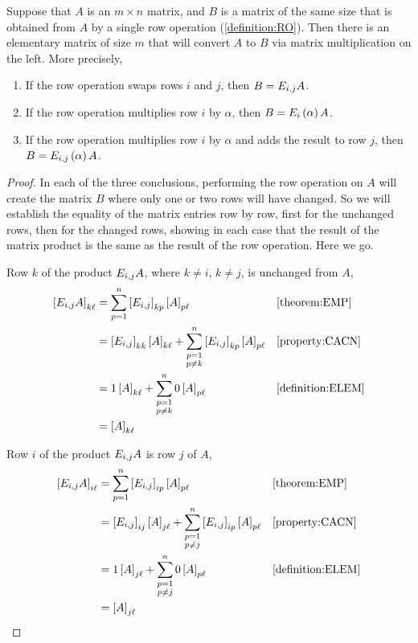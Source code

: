 \documentclass{ximera}
\begin{document}
\begin{theorem}
\label{theorem:EMDRO}

Suppose that $A$ is an $m\times n$ matrix, and $B$ is a matrix of the
same size that is obtained from $A$ by a single row operation
(\ref{definition:RO}).  Then there is an elementary matrix of size $m$
that will convert $A$ to $B$ via matrix multiplication on the left.
More precisely,
\begin{enumerate}
\item If the row operation swaps rows $i$ and $j$, then
  $B=E_{i,j}A$.
\item If the row operation multiplies row $i$ by $\alpha$, then
  $B=E_{i}\left(\alpha\right)A$.
\item If the row operation multiplies row $i$ by $\alpha$ and adds the
  result to row $j$, then $B=E_{i,j}\left(\alpha\right)A$.
\end{enumerate}

\begin{proof}
  In each of the three conclusions, performing the row operation on
  $A$ will create the matrix $B$ where only one or two rows will have
  changed.  So we will establish the equality of the matrix entries
  row by row, first for the unchanged rows, then for the changed rows,
  showing in each case that the result of the matrix product is the
  same as the result of the row operation.  Here we go.

  Row $k$ of the product $E_{i,j}A$, where $k\neq i$, $k\neq j$, is unchanged from $A$,
  \begin{align*}
    \left\lbrack E_{i,j}A\right\rbrack_{k\ell}
    &=\sum_{p=1}^{n}\left\lbrack E_{i,j}\right\rbrack_{kp}\left\lbrack A\right\rbrack_{p\ell}
    &&\ref{theorem:EMP}\\
    &=\left\lbrack E_{i,j}\right\rbrack_{kk}\left\lbrack A\right\rbrack_{k\ell}+
      \sum_{\substack{p=1\\p\neq k}}^{n}\left\lbrack E_{i,j}\right\rbrack_{kp}\left\lbrack A\right\rbrack_{p\ell}
    &&\ref{property:CACN}\\
    &=1\left\lbrack A\right\rbrack_{k\ell}+
      \sum_{\substack{p=1\\p\neq k}}^{n}0\left\lbrack A\right\rbrack_{p\ell}
    &&\ref{definition:ELEM}\\
    &=\left\lbrack A\right\rbrack_{k\ell}
  \end{align*}

  Row $i$ of the product $E_{i,j}A$ is row $j$ of $A$,
  \begin{align*}
    \left\lbrack E_{i,j}A\right\rbrack_{i\ell}
    &=\sum_{p=1}^{n}\left\lbrack E_{i,j}\right\rbrack_{ip}\left\lbrack A\right\rbrack_{p\ell}
    &&\ref{theorem:EMP}\\
    &=\left\lbrack E_{i,j}\right\rbrack_{ij}\left\lbrack A\right\rbrack_{j\ell}+
      \sum_{\substack{p=1\\p\neq j}}^{n}\left\lbrack E_{i,j}\right\rbrack_{ip}\left\lbrack A\right\rbrack_{p\ell}
    &&\ref{property:CACN}\\
    &=1\left\lbrack A\right\rbrack_{j\ell}+
      \sum_{\substack{p=1\\p\neq j}}^{n}0\left\lbrack A\right\rbrack_{p\ell}
    &&\ref{definition:ELEM}\\
    &=\left\lbrack A\right\rbrack_{j\ell}
  \end{align*}


\end{proof}
\end{theorem}
\end{document}
